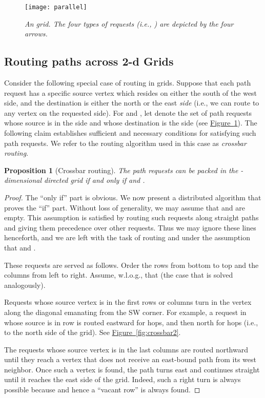 \documentclass[11pt]{article}
\newtheorem{proposition}[theorem]{Proposition}
\newcommand{\namedref}[2]{\hyperref[#2]{#1~\ref*{#2}}}
\newcommand{\figref}[1]{\namedref{Figure}{#1}}
\newenvironment{proof sketch}[1]{\noindent {\emph{Proof sketch of #1:}}}{\hfill \qed}
\begin{document}
\begin{figure}[t]
      \centering
        \texttt{[image: parallel]}
        \caption{\em An   grid. The four types
        of requests (i.e., ) are depicted
        by the four arrows.}
      \label{fig:crossbar}
    \end{figure}

\subsection{Routing paths across 2-d
  Grids}
Consider the following special case of routing in grids.
Suppose that each path request has a specific source vertex which
resides on either the south of the west side, and the destination is
either the north or the east \emph{side} (i.e., we can route to any
vertex on the requested side).
  For  and , let
 denote the set of path requests whose source
is in the  side and whose destination is the  side
(see \figref{fig:crossbar}).
The following claim establishes  sufficient and necessary conditions
for satisfying such path requests. We refer to the routing algorithm used in this
case as \emph{crossbar routing}.
\begin{proposition}[Crossbar routing]
\label{prop:crossbar}\sloppy
The path requests can be packed in the -dimensional 
directed grid  if and only if  and
.
\end{proposition}
\begin{proof}
  The ``only if'' part is obvious. We now present a distributed
  algorithm that proves the ``if'' part.  Without loss of generality,
  we may assume that  and  are empty. This
  assumption is satisfied by routing such requests along straight
  paths and giving them precedence over other requests. Thus we may
  ignore these lines henceforth, and we are left with the task of
  routing  and  under the assumption that
   and .

  These requests are served as follows.  Order the rows from bottom
  to top and the columns from left to right. Assume, w.l.o.g.,  that 
  (the case that  is solved analogously).

  Requests whose source vertex is in the first  rows or columns
  turn in the vertex along the diagonal emanating from the SW
  corner. For example, a request in  whose source
  is in row  is routed eastward for  hops, and then
  north for  hops (i.e., to the north side of the grid). See
  \figref{fig:crossbar2}.

  The requests whose source vertex is in the last  columns are
  routed northward until they reach a vertex that does not receive an
  east-bound path from its west neighbor. Once such a vertex is found,
  the path turns east and continues straight until it reaches the east
  side of the grid.  Indeed, such a right turn is always possible
  because  and hence a ``vacant row'' is always
  found.
\end{proof}
\end{document}

